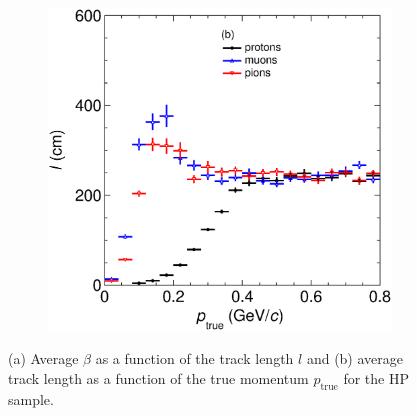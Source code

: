 \begin{figure}[!ht]
\begin{subfigure}[b]{0.49\textwidth}
         \includegraphics[width=\textwidth]{figures/ch5-KF_NDGAr/ToySample/HighPres/testNDGArMirrorLengthVSp.eps}
         \caption{}
         \label{fig:lengthVSp}
     \end{subfigure}
        \caption{(a) Average $\beta$ as a function of the track length $l $ and  (b) average track length as a function of the true momentum $p_\textrm{true}$ for the HP sample.}
        \label{fig:ND-GArextraprops}
\end{figure}


